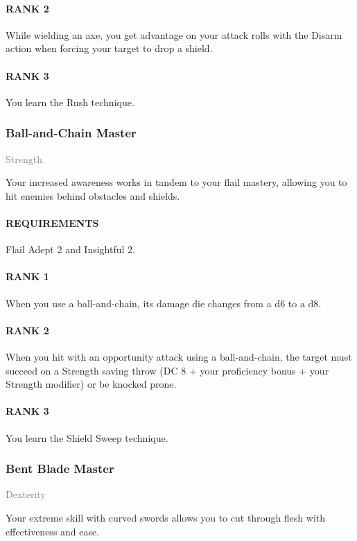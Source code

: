 \paragraph{RANK 2} While wielding an axe, you get advantage on your attack rolls with the Disarm action when forcing your target to drop a shield.
\paragraph{RANK 3} You learn the Rush technique.

\subsubsection{Ball-and-Chain Master} \label{feat::ballandchainmaster}
\small{\textcolor{gray}{Strength}}

\normalsize
Your increased awareness works in tandem to your flail mastery, allowing you to hit enemies behind obstacles and shields.
\paragraph{REQUIREMENTS} Flail Adept 2 and Insightful 2.
\paragraph{RANK 1} When you use a ball-and-chain, its damage die changes from a d6 to a d8.
\paragraph{RANK 2} When you hit with an opportunity attack using a ball-and-chain, the target must succeed on a Strength saving throw (DC 8 + your proficiency bonus + your Strength modifier) or be knocked prone.
\paragraph{RANK 3} You learn the Shield Sweep technique.

\subsubsection{Bent Blade Master} \label{feat::bentblademaster}
\small{\textcolor{gray}{Dexterity}}

\normalsize
Your extreme skill with curved swords allows you to cut through flesh with effectiveness and ease.

